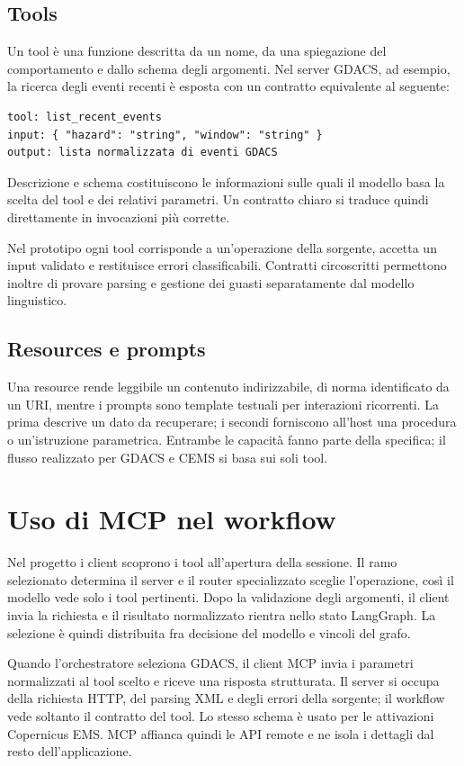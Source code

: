 \subsection{Tools}

Un tool è una funzione descritta da un nome, da una spiegazione del comportamento
e dallo schema degli argomenti. Nel server GDACS, ad esempio, la ricerca degli
eventi recenti è esposta con un contratto equivalente al seguente:
\begin{verbatim}
tool: list_recent_events
input: { "hazard": "string", "window": "string" }
output: lista normalizzata di eventi GDACS
\end{verbatim}

Descrizione e schema costituiscono le informazioni sulle quali il modello basa
la scelta del tool e dei relativi parametri. Un contratto chiaro si traduce
quindi direttamente in invocazioni più corrette.

Nel prototipo ogni tool corrisponde a un'operazione della sorgente, accetta un
input validato e restituisce errori classificabili. Contratti circoscritti
permettono inoltre di provare parsing e gestione dei guasti separatamente dal
modello linguistico.

\subsection{Resources e prompts}

Una resource rende leggibile un contenuto indirizzabile, di norma identificato da
un URI, mentre i prompts sono template testuali per interazioni ricorrenti. La
prima descrive un dato da recuperare; i secondi forniscono all'host una procedura
o un'istruzione parametrica. Entrambe le capacità fanno parte della specifica; il
flusso realizzato per GDACS e CEMS si basa sui soli tool.

\section{Uso di MCP nel workflow}

Nel progetto i client scoprono i tool all'apertura della sessione. Il ramo
selezionato determina il server e il router specializzato sceglie l'operazione,
così il modello vede solo i tool pertinenti. Dopo la validazione degli argomenti,
il client invia la richiesta e il risultato normalizzato rientra nello stato
LangGraph. La selezione è quindi distribuita fra decisione del modello e vincoli
del grafo.

Quando l'orchestratore seleziona GDACS, il client MCP invia i parametri
normalizzati al tool scelto e riceve una risposta strutturata. Il server si
occupa della richiesta HTTP, del parsing XML e degli errori della sorgente; il
workflow vede soltanto il contratto del tool. Lo stesso schema è usato per le
attivazioni Copernicus EMS. MCP affianca quindi le API remote e ne isola i
dettagli dal resto dell'applicazione.

